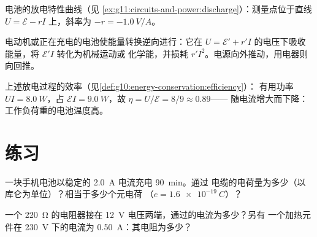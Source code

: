 \begin{omfigure}

{\small 电池的放电特性曲线（见
\cref{ex:g11:circuits-and-power:discharge}）：测量点位于直线
$U = \mathcal{E} - rI$ 上，斜率为 $-r = \qty{-1.0}{V/A}$。}
\end{omfigure}

\begin{remark}[用电器]\label{rem:g11:circuits-and-power:receivers}
电动机或正在充电的电池使能量转换逆向进行：它在
$U = \mathcal{E}' + r'I$ 的电压下吸收能量，将 $\mathcal{E}'I$ 转化为机械运动或
化学能，并损耗 $r'I^2$。电源向外推动，用电器则向回推。
\end{remark}

\begin{example}[电池的效率]\label{ex:g11:circuits-and-power:efficiency}
上述放电过程的效率（见\cref{def:g10:energy-conservation:efficiency}）：
有用功率 $UI = \qty{8.0}{W}$，占 $\mathcal{E}I =
\qty{9.0}{W}$，故 $\eta = U/\mathcal{E} = 8/9 \approx 0.89$——
随电流增大而下降：工作负荷重的电池温度高。
\end{example}

\section{练习}

\begin{exercise}[$\star$]\label{exo:g11:circuits-and-power:1}
一块手机电池以稳定的 \qty{2.0}{A} 电流充电 \qty{90}{min}。通过
电缆的电荷量为多少（以库仑为单位）？相当于多少个元电荷
（$e = \qty{1.6e-19}{C}$）？
\end{exercise}

\begin{exercise}[$\star$]\label{exo:g11:circuits-and-power:2}
一个 \qty{220}{\ohm} 的电阻器接在 \qty{12}{V} 电压两端，通过的电流为多少？另有
一个加热元件在 \qty{230}{V} 下的电流为 \qty{0.50}{A}：其电阻为多少？
\end{exercise}

